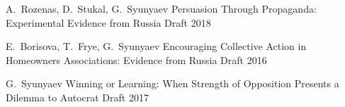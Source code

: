 \begin{cventries}

  \cventry
    {A.~Rozenas, D.~Stukal, G.~Syunyaev} %
    {Persuasion Through Propaganda: Experimental Evidence from Russia} %
    {Draft} %
    {2018} %
    {
    }

  \cventry
    {E.~Borisova, T.~Frye, G.~Syunyaev} %
    {Encouraging Collective Action in Homeowners Associations: Evidence from Russia} %
    {Draft} %
    {2016} %
    {
    }

  \cventry
    {G.~Syunyaev} %
    {Winning or Learning: When Strength of Opposition Presents a Dilemma to Autocrat} %
    {Draft} %
    {2017} %
    {
    }

\end{cventries}

